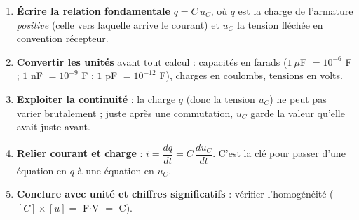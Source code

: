 \documentclass[11pt]{article}
\begin{document}
\begin{methode}
\begin{enumerate}
\item \textbf{Écrire la relation fondamentale} $q = C\,u_C$, où $q$ est la charge de l'armature \emph{positive} (celle vers laquelle arrive le courant) et $u_C$ la tension fléchée en convention récepteur.
\item \textbf{Convertir les unités} avant tout calcul : capacités en farads ($1~\mu$F $= 10^{-6}$ F ; $1$ nF $= 10^{-9}$ F ; $1$ pF $= 10^{-12}$ F), charges en coulombs, tensions en volts.
\item \textbf{Exploiter la continuité} : la charge $q$ (donc la tension $u_C$) ne peut pas varier brutalement ; juste après une commutation, $u_C$ garde la valeur qu'elle avait juste avant.
\item \textbf{Relier courant et charge} : $i = \dfrac{dq}{dt} = C\,\dfrac{du_C}{dt}$. C'est la clé pour passer d'une équation en $q$ à une équation en $u_C$.
\item \textbf{Conclure avec unité et chiffres significatifs} : vérifier l'homogénéité ($[C]\times[u] = $ F$\cdot$V $=$ C).
\end{enumerate}
\end{methode}
\end{document}
